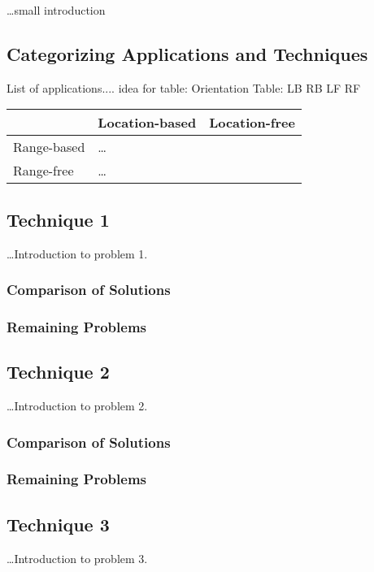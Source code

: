 \ldots small introduction

   \subsection{Categorizing Applications and Techniques}

  List of applications.... idea for table: Orientation Table: LB RB LF RF\\
  
  \begin{tabular}{|p{3cm}|p{3cm}|p{3cm}|}
    \hline
     & Location-based & Location-free\\\hline
    Range-based & \ldots & \\\hline
    Range-free & \ldots & \\
    \hline
  \end{tabular}


    \subsection{Technique 1}

      \ldots Introduction to problem 1.

      \subsubsection{Comparison of Solutions}
      \subsubsection{Remaining Problems}

    \subsection{Technique 2}

      \ldots Introduction to problem 2.

      \subsubsection{Comparison of Solutions}
      \subsubsection{Remaining Problems}

    \subsection{Technique 3}
      \ldots Introduction to problem 3.

